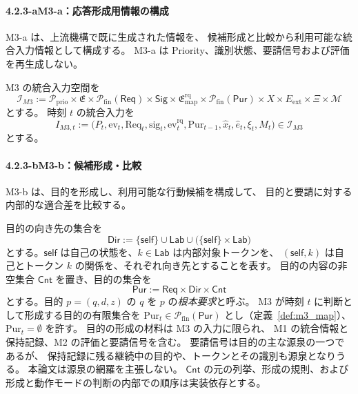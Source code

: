 \paragraph*{4.2.3-a\quad M3-a：応答形成用情報の構成}

M3-a は、上流機構で既に生成された情報を、
候補形成と比較から利用可能な統合入力情報として構成する。
M3-a は Priority、識別状態、要請信号および評価を再生成しない。

\begin{definition}
\label{def:m3a_info}
M3 の統合入力空間を
\[
  \mathcal I_{M3}
  :=
  \mathcal P_{\mathrm{prio}}
  \times\mathfrak E
  \times\mathcal P_{\mathrm{fin}}(\mathsf{Req})
  \times\mathsf{Sig}
  \times\mathfrak E^{\mathrm{rq}}_{\mathrm{map}}
  \times\mathcal P_{\mathrm{fin}}(\mathsf{Pur})
  \times X
  \times E_{\mathrm{ext}}
  \times\Xi
  \times\mathcal M
\]
とする。
時刻 $t$ の統合入力を
\[
  I_{M3,t}
  :=
  \bigl(
    P_t,
    \mathrm{ev}_t,
    \mathrm{Req}_t,
    \mathrm{sig}_t,
    \mathrm{ev}^{\mathrm{rq}}_t,
    \mathrm{Pur}_{t-1},
    \hat x_t,
    \hat e_t,
    \xi_t,
    M_t
  \bigr)
  \in\mathcal I_{M3}
\]
とする。
\end{definition}

\paragraph*{4.2.3-b\quad M3-b：候補形成・比較}

M3-b は、目的を形成し、利用可能な行動候補を構成して、
目的と要請に対する内部的な適合差を比較する。

\begin{definition}
\label{def:purpose_formation}
目的の向き先の集合を
\[
  \mathsf{Dir}:=\{\mathsf{self}\}\cup\mathsf{Lab}\cup\bigl(\{\mathsf{self}\}\times\mathsf{Lab}\bigr)
\]
とする。$\mathsf{self}$ は自己の状態を、$k\in\mathsf{Lab}$ は内部対象トークンを、
$(\mathsf{self},k)$ は自己とトークン $k$ の関係を、それぞれ向き先とすることを表す。
目的の内容の非空集合 $\mathsf{Cnt}$ を置き、目的の集合を
\[
  \mathsf{Pur}:=\mathsf{Req}\times\mathsf{Dir}\times\mathsf{Cnt}
\]
とする。目的 $p=(q,d,z)$ の $q$ を $p$ の\emph{根本要求}と呼ぶ。
M3 が時刻 $t$ に判断として形成する目的の有限集合を
$\mathrm{Pur}_t\in\mathcal P_{\mathrm{fin}}(\mathsf{Pur})$ とし（定義~\ref{def:m3_map}）、
$\mathrm{Pur}_t=\emptyset$ を許す。
目的の形成の材料は M3 の入力に限られ、
M1 の統合情報と保持記録、M2 の評価と要請信号を含む。
要請信号は目的の主な源泉の一つであるが、
保持記録に残る継続中の目的や、トークンとその識別も源泉となりうる。
本論文は源泉の網羅を主張しない。
$\mathsf{Cnt}$ の元の列挙、形成の規則、および形成と動作モードの判断の内部での順序は実装依存とする。
\end{definition}

